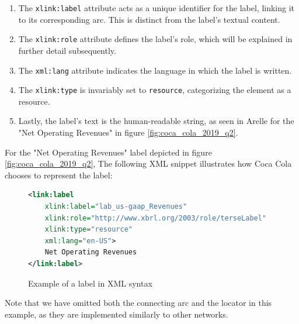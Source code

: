 

\begin{enumerate}
    \item The \texttt{xlink:label} attribute acts as a unique identifier for the label, linking it to its corresponding arc.  
    This is distinct from the label's textual content.  
    \item The \texttt{xlink:role} attribute defines the label's role, which will be explained in further detail subsequently.  
    \item The \texttt{xml:lang} attribute indicates the language in which the label is written.  
    \item The \texttt{xlink:type} is invariably set to \texttt{resource}, categorizing the element as a resource.  
    \item Lastly, the label's text is the human-readable string, as seen in Arelle for the "Net Operating Revenues" in figure \ref{fig:coca_cola_2019_q2}.  
\end{enumerate}

For the "Net Operating Revenues" label depicted in figure \ref{fig:coca_cola_2019_q2}, 
The following XML snippet illustrates how Coca Cola\cite{ko2019q2} chooses to represent the label:

\begin{figure}[H]
    \begin{lstlisting}[language=XML, basicstyle=\ttfamily\small]
<link:label 
    xlink:label="lab_us-gaap_Revenues" 
    xlink:role="http://www.xbrl.org/2003/role/terseLabel" 
    xlink:type="resource" 
    xml:lang="en-US">
    Net Operating Revenues
</link:label>
\end{lstlisting}
    \caption{Example of a label in XML syntax}
    \label{fig:example_label_xml}
\end{figure}

Note that we have omitted both the connecting arc and the locator in this example, 
as they are implemented similarly to other networks.


